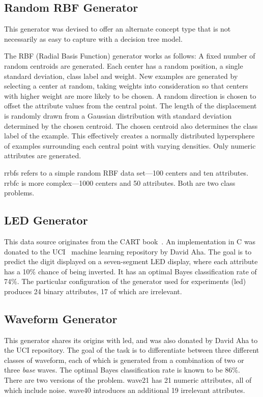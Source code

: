 \subsection{Random RBF Generator}
\label{sec:randrbf}

This generator was devised to offer an alternate concept type that is not necessarily as easy to capture with a decision tree model.

The RBF (Radial Basis Function) generator works as follows:
A fixed number of random centroids are generated. Each center has a random position, a single standard deviation, class label and weight. New examples are generated by selecting a center at random, taking weights into consideration so that centers with higher weight are more likely to be chosen. A random direction is chosen to offset the attribute values from the central point. The length of the displacement is randomly drawn from a Gaussian distribution with standard deviation determined by the chosen centroid. The chosen centroid also determines the class label of the example. This effectively creates a normally distributed hypersphere of examples surrounding each central point with varying densities. Only numeric attributes are generated.

{\sc rrbfs} refers to a simple random RBF data set---100 centers and ten attributes. 
{\sc rrbfc} is more complex---1000 centers and 50 attributes. 
Both are two class problems.

\subsection{LED Generator}
\label{sec:led}

This data source originates from the CART book~\cite{cart}. An implementation in C was donated to the UCI~\cite{uci} machine learning repository by David Aha. The goal is to predict the digit displayed on a seven-segment LED display, where each attribute has a 10\% chance of being inverted. It has an optimal Bayes classification rate of 74\%. The particular configuration of the generator used for experiments ({\sc led}) produces 24 binary attributes, 17 of which are irrelevant.

\subsection{Waveform Generator}
\label{sec:waveform}

This generator shares its origins with {\sc led}, and was also donated by David Aha to the UCI repository. The goal of the task is to differentiate between three different classes of waveform, each of which is generated from a combination of two or three {\em base} waves. The optimal Bayes classification rate is known to be 86\%. There are two versions of the problem. {\sc wave21} has 21 numeric attributes, all of which include noise. {\sc wave40} introduces an additional 19 irrelevant attributes.

